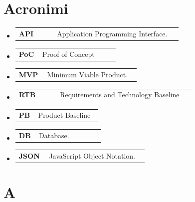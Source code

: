 \documentclass[a4paper,12pt]{article}
\begin{document}
\section{Acronimi}
\begin{itemize}
    \item \begin{tabular}{p{0.22\linewidth} p{0.72\linewidth}}
        \textbf{API} & Application Programming Interface. \\
        \end{tabular}
    \item \begin{tabular}{p{0.22\linewidth} p{0.72\linewidth}}
        \textbf{PoC} & Proof of Concept \\
        \end{tabular}
    \item \begin{tabular}{p{0.22\linewidth} p{0.72\linewidth}}
        \textbf{MVP} & Minimum Viable Product. \\
        \end{tabular}
    \item \begin{tabular}{p{0.22\linewidth} p{0.72\linewidth}}
        \textbf{RTB} & Requirements and Technology Baseline \\
        \end{tabular}
    \item \begin{tabular}{p{0.22\linewidth} p{0.72\linewidth}}
        \textbf{PB} & Product Baseline \\
        \end{tabular}
    \item \begin{tabular}{p{0.22\linewidth} p{0.72\linewidth}}
        \textbf{DB} & Database. \\
        \end{tabular}
    \item \begin{tabular}{p{0.22\linewidth} p{0.72\linewidth}}
        \textbf{JSON} & JavaScript Object Notation. \\
        \end{tabular}
\end{itemize}

\section{A}
\end{document}
